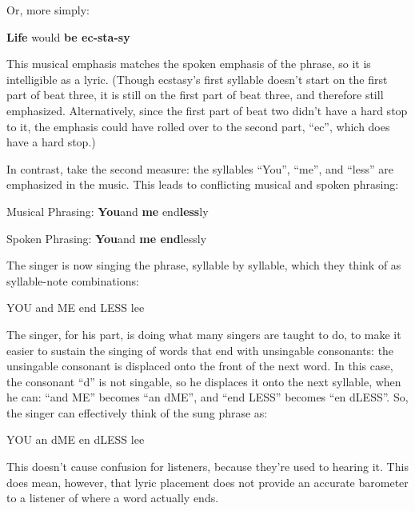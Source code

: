 \documentclass{article}
\begin{document}
{\large Or, more simply:}

\begin{center}
{\large \textbf{Life }}{\large would }{\large \textbf{be ec-sta-sy}}
\end{center}

{\large This musical emphasis matches the spoken emphasis of the phrase, so it 
is intelligible as a lyric. (Though ecstasy's first syllable doesn't start on the 
first part of beat three, it is still on the first part of beat three, and therefore 
still emphasized. Alternatively, since the first part of beat two didn't have a 
hard stop to it, the emphasis could have rolled over to the second part, ``ec'', 
which does have a hard stop.)}

{\large In contrast, take the second measure: the syllables ``You'', ``me'', and 
``less'' are emphasized in the music. This leads to conflicting musical and spoken 
phrasing:}

\begin{center}
{\large Musical Phrasing: }{\large \textbf{You}}{\large  and }{\large \textbf{me}}{\large  
end}{\large \textbf{less}}{\large ly }

{\large Spoken Phrasing: }{\large \textbf{You}}{\large  and }{\large \textbf{me 
end}}{\large lessly}
\end{center}

{\large The singer is now singing the phrase, syllable by syllable, which they 
think of as syllable-note combinations:}

\begin{center}
{\large YOU and ME end LESS lee}
\end{center}

{\large The singer, for his part, is doing what many singers are taught to do, 
to make it easier to sustain the singing of words that end with unsingable consonants: 
the unsingable consonant is displaced onto the front of the next word. In this 
case, the consonant ``d'' is not singable, so he displaces it onto the next syllable, 
when he can: ``and ME'' becomes ``an dME'', and ``end LESS'' becomes ``en dLESS''. 
So, the singer can effectively think of the sung phrase as:}

\begin{center}
{\large YOU an dME en dLESS lee}
\end{center}

\vspace{12pt}
{\large This doesn't cause confusion for listeners, because they're used to hearing 
it. This does mean, however, that lyric placement does not provide an accurate 
barometer to a listener of where a word actually ends.}
\end{document}
